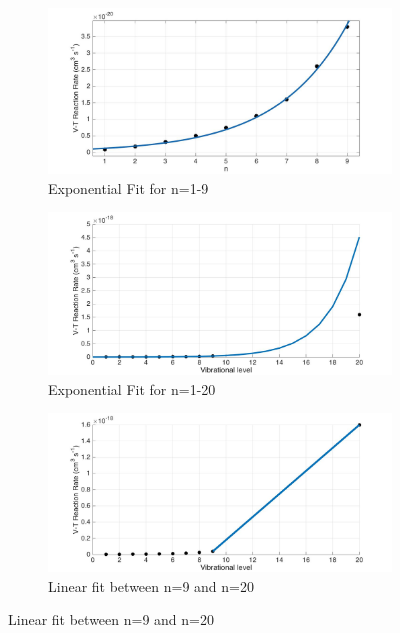 \documentclass[11pt, oneside]{article}   	%
\begin{document}
\begin{figure}
\begin{subfigure}{0.5\textwidth}
\begin{center}
\includegraphics[width=\textwidth]{Figures/ExpFit}
\caption{Exponential Fit for n=1-9}
\end{center}
\end{subfigure}
\begin{subfigure}{0.5\textwidth}
\includegraphics[width=\textwidth]{Figures/ExpFitAll}
\caption{Exponential Fit for n=1-20}
\end{subfigure}
\begin{subfigure}{0.5\textwidth}
\includegraphics[width=\textwidth]{Figures/Linear}
\caption{Linear fit between n=9 and n=20}

\end{subfigure}
\end{figure}
\end{document}
